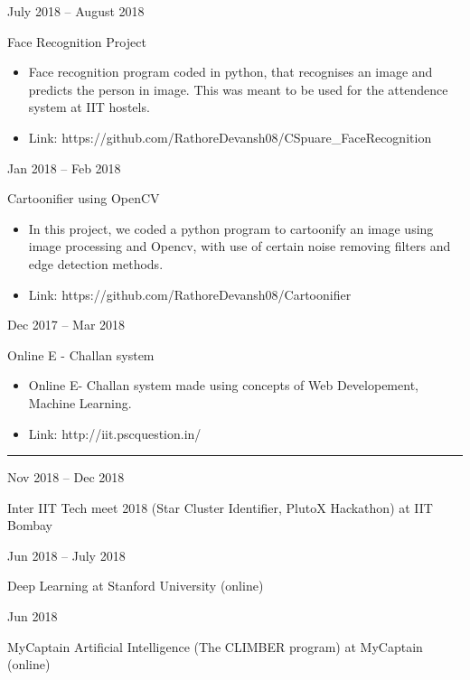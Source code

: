 \documentclass[a4paper,10pt]{article}
\newlength{\cvcolumngapwidth}
\newlength{\cvleftcolumnwidth}
\newlength{\cvrightcolumnwidth}
\newcommand{\cvsectionstyle}[1]{{\normalsize\cvsectionfont\textcolor{cvsectioncolor}{#1}}}
\newcommand{\cvtitlestyle}[1]{{\large\cvtitlefont\textcolor{cvtitlecolor}{#1}}}
\newcommand{\cvdurationstyle}[1]{{\small\cvdurationfont\textcolor{cvdurationcolor}{#1}}}
\newlength{\cvafteritemskipamount}
\newlength{\cvaftersectionskipamount}
\newlength{\cvbetweensectionandheadingextraskipamount}
\newlength{\cvaftertitleskipamount}
\newlength{\cvparskip}
\newcommand{\cvsection}[1]{
    \begin{minipage}[t]{\cvleftcolumnwidth}
        \raggedleft\cvsectionstyle{#1}
    \end{minipage}%
    \hspace{\cvcolumngapwidth}%
    \begin{minipage}[t]{\cvrightcolumnwidth}
        \textcolor{cvrulecolor}{\rule{\cvrightcolumnwidth}{0.3mm}}
    \end{minipage}

    \vspace{\cvaftersectionskipamount}
}
\newcommand{\cvitem}[2]{
    \begin{minipage}[t]{\cvleftcolumnwidth}
        \raggedleft #1
    \end{minipage}%
    \hspace{\cvcolumngapwidth}%
    \begin{minipage}[t]{\cvrightcolumnwidth}
        \setlength{\parskip}{\cvparskip} #2
    \end{minipage}

    \vspace{\cvafteritemskipamount}
}
\newcommand{\cvtitle}[1]{
    \cvtitlestyle{#1}

    \vspace{\cvaftertitleskipamount}
    \vspace{-\cvparskip}
}
\begin{document}
\cvitem{
    \cvdurationstyle{July 2018 -- August 2018}
}{
    \cvtitle{Face Recognition Project}

    \begin{itemize}[leftmargin=*]
        \item Face recognition program coded in python, that recognises an image and predicts the person in image. This was meant to be used for the attendence system at IIT hostels. 
        \item Link: https://github.com/RathoreDevansh08/CSpuare\_FaceRecognition
        
    \end{itemize}
}

\cvitem{
    \cvdurationstyle{Jan 2018 -- Feb 2018}
}{
    \cvtitle{Cartoonifier using OpenCV}
    \begin{itemize}[leftmargin=*]
        \item In this project, we coded a python program to cartoonify an image using image processing and Opencv, with use of certain noise removing filters and edge detection methods. 
        \item Link: https://github.com/RathoreDevansh08/Cartoonifier
        
    \end{itemize}
}

\cvitem{
    \cvdurationstyle{Dec 2017 -- Mar 2018}
}{
    \cvtitle{Online E - Challan system}
    \begin{itemize}[leftmargin=*]
        \item Online E- Challan system made using concepts of Web Developement, Machine Learning.
        \item Link: http://iit.pscquestion.in/
        
    \end{itemize}
}



\cvsection{TRAINING AND WORKSHOPS}

\vspace{\cvbetweensectionandheadingextraskipamount}

\cvitem{
    \cvdurationstyle{Nov 2018 -- Dec 2018}
}{
    \cvtitle{Inter IIT Tech meet 2018 (Star Cluster Identifier, PlutoX Hackathon) at IIT Bombay}
}

\cvitem{
    \cvdurationstyle{Jun 2018 -- July 2018}
}{
    \cvtitle{Deep Learning at Stanford University (online)}
}

\cvitem{
    \cvdurationstyle{Jun 2018}
}{
    \cvtitle{MyCaptain Artificial Intelligence (The CLIMBER program) at MyCaptain (online)}
}
\end{document}
